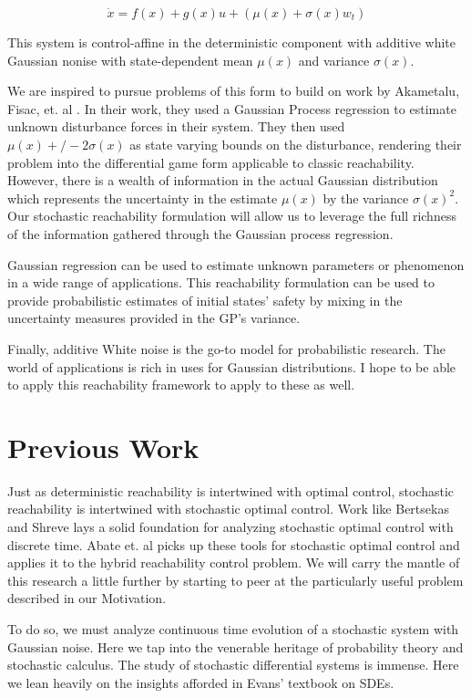 \documentclass[a4paper]{article}
\begin{document}
\begin{equation}
  \dot{x} = f(x) + g(x) u + (\mu(x) + \sigma(x) w_t)
\end{equation}

This system is control-affine in the deterministic component with additive white Gaussian nonise with state-dependent mean $\mu(x)$ and variance $\sigma(x)$.

We are inspired to pursue problems of this form to build on work by Akametalu, Fisac, et. al \cite{KeneJaime}.
In their work, they used a Gaussian Process regression to estimate unknown disturbance forces in their system.
They then used $\mu(x) +/- 2 \sigma(x)$ as state varying bounds on the disturbance, rendering their problem into the differential game form applicable to classic reachability.
However, there is a wealth of information in the actual Gaussian distribution which represents the uncertainty in the estimate $\mu(x)$ by the variance $\sigma(x)^2$.
Our stochastic reachability formulation will allow us to leverage the full richness of the information gathered through the Gaussian process regression.

Gaussian regression can be used to estimate unknown parameters or phenomenon in a wide range of applications.
This reachability formulation can be used to provide probabilistic estimates of initial states' safety by mixing in the uncertainty measures provided in the GP's variance.

Finally, additive White noise is the go-to model for probabilistic research.
The world of applications is rich in uses for Gaussian distributions.
I hope to be able to apply this reachability framework to apply to these as well.

\section{Previous Work}
Just as deterministic reachability is intertwined with optimal control, stochastic reachability is intertwined with stochastic optimal control.
Work like Bertsekas and Shreve \cite{Bertsekas} lays a solid foundation for analyzing stochastic optimal control with discrete time.
Abate et. al \cite{AbateStoch} picks up these tools for stochastic optimal control and applies it to the hybrid reachability control problem.
We will carry the mantle of this research a little further by starting to peer at the particularly useful problem described in our Motivation.

To do so, we must analyze continuous time evolution of a stochastic system with Gaussian noise.
Here we tap into the venerable heritage of probability theory and stochastic calculus.
The study of stochastic differential systems is immense.
Here we lean heavily on the insights afforded in Evans' textbook on SDEs\cite{EvansSDE}.
\end{document}
